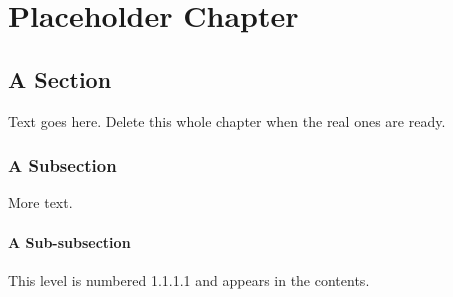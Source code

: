 \documentclass[12pt,a4paper,oneside]{report}
\begin{document}
\chapter{Placeholder Chapter}
\section{A Section}
Text goes here. Delete this whole chapter when the real ones are ready.

\subsection{A Subsection}
More text.

\subsubsection{A Sub-subsection}
This level is numbered 1.1.1.1 and appears in the contents.




\end{document}
